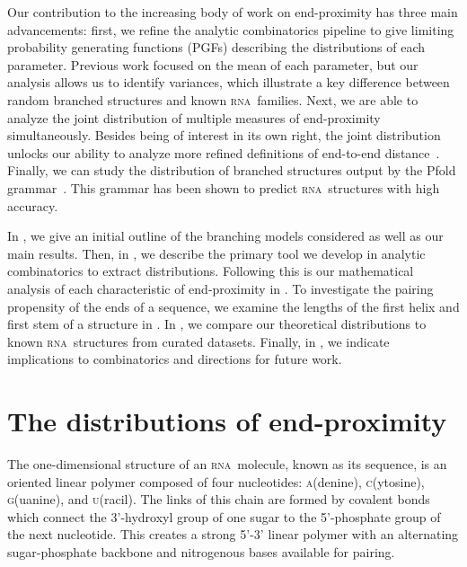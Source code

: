 \documentclass{article}
\newcommand{\RNA}{\textsc{rna}}
\newcommand{\A}{\textsc{a}}
\newcommand{\C}{\textsc{c}}
\newcommand{\G}{\textsc{g}}
\newcommand{\U}{\textsc{u}}
\begin{document}
Our contribution to the increasing body of work on end-proximity has three main advancements: first, we refine the analytic combinatorics pipeline to give limiting probability generating functions (PGFs) describing the distributions of each parameter.  Previous work focused on the mean of each parameter, but our analysis allows us to identify variances, which illustrate a key difference between random branched structures and known \RNA\ families.  Next, we are able to analyze the joint distribution of multiple measures of end-proximity simultaneously.  Besides being of interest in its own right, the joint distribution unlocks our ability to analyze more refined definitions of end-to-end distance~\cite{Aalberts:2010}.  Finally, we can study the distribution of branched structures output by the Pfold grammar~\cite{Knudsen:2003}.  This grammar has been shown to predict \RNA\ structures with high accuracy.

In , we give an initial outline of the branching models considered as well as our main results.  Then, in , we describe the primary tool we develop in analytic combinatorics to extract distributions.  Following this is our mathematical analysis of each characteristic of end-proximity in .  To investigate the pairing propensity of the ends of a sequence, we examine the lengths of the first helix and first stem of a structure in .  In , we compare our theoretical distributions to known \RNA\ structures from curated datasets. Finally, in , we indicate implications to combinatorics and directions for future work.

\section{The distributions of end-proximity} \label{sec:Overview}


The one-dimensional structure of an \RNA\ molecule, known as its sequence,
is an oriented linear polymer composed of four nucleotides: 
\A(denine), \C(ytosine), \G(uanine), and \U(racil).
The links of this chain are formed by covalent bonds which connect the 
3'-hydroxyl group of one sugar to the 5'-phosphate group of the next 
nucleotide.
This creates a strong 5'-3' linear polymer with an alternating 
sugar-phosphate backbone and nitrogenous bases available for pairing.
\end{document}
